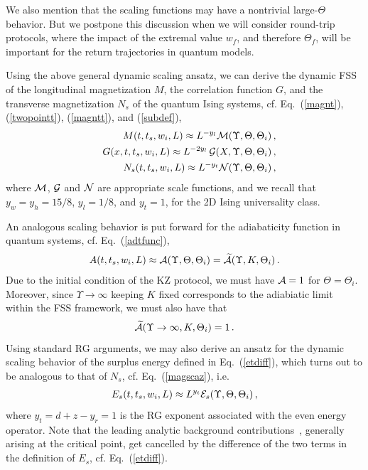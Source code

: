 We also mention that the scaling functions may have a nontrivial
large-$\Theta$ behavior.  But we postpone this discussion when we will
consider round-trip protocols, where the impact of the extremal value
$w_f$, and therefore $\Theta_f$, will be important for the return
trajectories in quantum models.


Using the above general dynamic scaling ansatz, we can derive the
dynamic FSS of the longitudinal magnetization $M$, the correlation
function $G$, and the transverse magnetization $N_s$ of the quantum
Ising systems, cf. Eq.~(\ref{magnt}), (\ref{twopointt}),
(\ref{magntt}), and (\ref{subdef}),
\begin{eqnarray}
&&  M(t,t_s,w_i,L) \approx L^{-y_l} {\cal
    M}(\Upsilon,\Theta,\Theta_i)\,,
  \label{magsca}\\
&&    G(x,t,t_s,w_i,L) \approx L^{-2y_l}\,
  {\cal G}(X,\Upsilon,\Theta,\Theta_i)\,,
  \label{G2sca}\\
    &&  N_s(t,t_s,w_i,L) \approx L^{-y_t} {\cal
    N}(\Upsilon,\Theta,\Theta_i)\,,
  \label{magscaz}
\end{eqnarray}
where ${\cal M}$, ${\cal G}$ and ${\cal N}$ are appropriate scale
  functions, and we recall that $y_w=y_h=15/8$, $y_l=1/8$, and
  $y_t=1$, for the 2D Ising universality class.

An analogous scaling behavior is put forward for the adiabaticity
function in quantum systems, cf. Eq.~(\ref{adtfunc}),
\begin{eqnarray}
  A(t,t_s,w_i,L) \approx {\cal A}(\Upsilon,\Theta,\Theta_i)
  = \widetilde{\cal A}(\Upsilon,K,\Theta_i)\,.
\label{wsca2}
\end{eqnarray}
Due to the initial condition of the KZ protocol, we must have ${\cal
  A}=1$ for $\Theta=\Theta_i$. Moreover, since $\Upsilon\to\infty$
keeping $K$ fixed corresponds to the adiabiatic limit within the FSS
framework, we must also have that
\begin{equation}
\widetilde{\cal A}(\Upsilon\to\infty,K,\Theta_i)=1\,.
\label{adlim}
\end{equation}
Using standard RG arguments, we may also derive an ansatz for the
dynamic scaling behavior of the surplus energy defined in
Eq.~(\ref{etdiff}), which turns out to be analogous
to that of $N_s$, cf. Eq.~(\ref{magscaz}), i.e.
\begin{eqnarray}
E_s(t,t_s,w_i,L) \approx L^{y_t} {\cal E}_s(\Upsilon,\Theta,\Theta_i)\,,
\label{essca}
\end{eqnarray}
where $y_t=d+z-y_r=1$ is the RG exponent associated with the even
energy operator. Note that the leading analytic background
contributions~\cite{CV2014,rossini2021coherent}, generally arising at the critical
point, get cancelled by the difference of the two terms in the
definition of $E_s$, cf. Eq.~(\ref{etdiff}).

